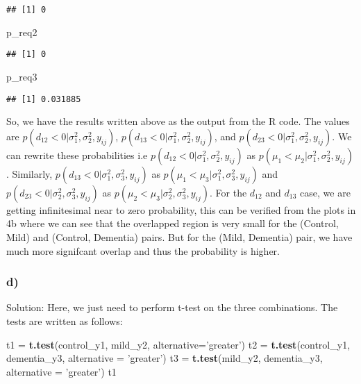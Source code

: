 \documentclass[]{article}
\newenvironment{Shaded}{\begin{snugshade}}{\end{snugshade}}
\newcommand{\KeywordTok}[1]{\textcolor[rgb]{0.13,0.29,0.53}{\textbf{{#1}}}}
\newcommand{\DataTypeTok}[1]{\textcolor[rgb]{0.13,0.29,0.53}{{#1}}}
\newcommand{\StringTok}[1]{\textcolor[rgb]{0.31,0.60,0.02}{{#1}}}
\newcommand{\NormalTok}[1]{{#1}}
\begin{document}
\begin{verbatim}
## [1] 0
\end{verbatim}

\begin{Shaded}
\begin{Highlighting}[]
\NormalTok{p_req2}
\end{Highlighting}
\end{Shaded}

\begin{verbatim}
## [1] 0
\end{verbatim}

\begin{Shaded}
\begin{Highlighting}[]
\NormalTok{p_req3}
\end{Highlighting}
\end{Shaded}

\begin{verbatim}
## [1] 0.031885
\end{verbatim}

So, we have the results written above as the output from the R code. The
values are \(p(d_{12} < 0| \sigma_1^2, \sigma_2^2, y_{ij})\),
\(p(d_{13} < 0| \sigma_1^2, \sigma_2^2, y_{ij})\), and
\(p(d_{23} < 0| \sigma_1^2, \sigma_2^2, y_{ij})\). We can rewrite these
probabilities i.e \(p(d_{12} < 0| \sigma_1^2, \sigma_2^2, y_{ij})\) as
\(p(\mu_1 < \mu_2| \sigma_1^2, \sigma_2^2, y_{ij})\). Similarly,
\(p(d_{13} < 0| \sigma_1^2, \sigma_3^2, y_{ij})\) as
\(p(\mu_1 < \mu_3| \sigma_1^2, \sigma_3^2, y_{ij})\) and
\(p(d_{23} < 0| \sigma_2^2, \sigma_3^2, y_{ij})\) as
\(p(\mu_2 < \mu_3| \sigma_2^2, \sigma_3^2, y_{ij})\). For the \(d_{12}\)
and \(d_{13}\) case, we are getting infinitesimal near to zero
probability, this can be verified from the plots in 4b where we can see
that the overlapped region is very small for the (Control, Mild) and
(Control, Dementia) pairs. But for the (Mild, Dementia) pair, we have
much more signifcant overlap and thus the probability is higher.

\subsubsection{d)}\label{d}

Solution: Here, we just need to perform t-test on the three
combinations. The tests are written as follows:

\begin{Shaded}
\begin{Highlighting}[]
\NormalTok{t1 =}\StringTok{ }\KeywordTok{t.test}\NormalTok{(control_y1, mild_y2, }\DataTypeTok{alternative=}\StringTok{'greater'}\NormalTok{)}
\NormalTok{t2 =}\StringTok{ }\KeywordTok{t.test}\NormalTok{(control_y1, dementia_y3, }\DataTypeTok{alternative =} \StringTok{'greater'}\NormalTok{)}
\NormalTok{t3 =}\StringTok{ }\KeywordTok{t.test}\NormalTok{(mild_y2, dementia_y3, }\DataTypeTok{alternative =} \StringTok{'greater'}\NormalTok{)}
\NormalTok{t1}
\end{Highlighting}
\end{Shaded}
\end{document}
